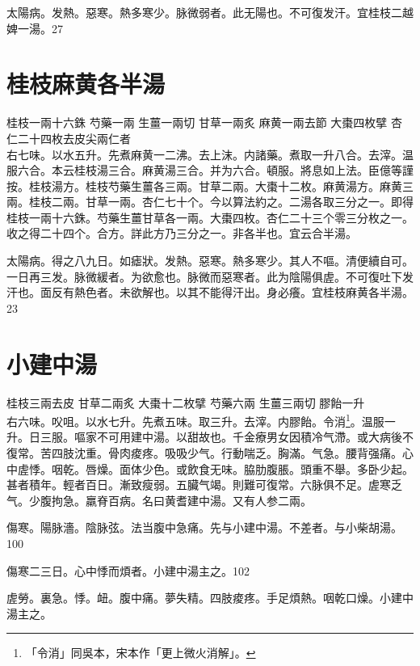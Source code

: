 太陽病。发熱。惡寒。熱多寒少。脉微弱者。此无陽也。不可{\khaai 復}发汗。{\khaai 宜桂枝二越婢一湯。}27

\section{桂枝麻黄各半湯}

桂枝{\scriptsize 一兩十六銖} 芍藥{\scriptsize 一兩} 生薑{\scriptsize 一兩切} 甘草{\scriptsize 一兩炙} 麻黄{\scriptsize 一兩去節} 大棗{\scriptsize 四枚擘} 杏仁{\scriptsize 二十四枚去皮尖兩仁者}\\
右七味。以水五升。先煮麻黄一二沸。去上沫。内諸藥。煮取一升八合。去滓。温服六合。本云桂枝湯三合。麻黄湯三合。并为六合。頓服。將息如上法。{\scriptsize 臣億等謹按。桂枝湯方。桂枝芍藥生薑各三兩。甘草二兩。大棗十二枚。麻黄湯方。麻黄三兩。桂枝二兩。甘草一兩。杏仁七十个。今以算法約之。二湯各取三分之一。即得桂枝一兩十六銖。芍藥生薑甘草各一兩。大棗四枚。杏仁二十三个零三分枚之一。收之得二十四个。合方。詳此方乃三分之一。非各半也。宜云合半湯。}

太陽病。得之八九日。如瘧狀。发熱。惡寒。熱多寒少。其人不嘔。清便續自可。一日再三发。脉微緩者。为欲愈也。脉微而惡寒者。此为陰陽俱虗。不可復{\khaai 吐下}发汗也。面反有熱色者。未欲解也。以其不能得汗出。身必癢。宜桂枝麻黄各半湯。23

\section{小建中湯}

桂枝{\scriptsize 三兩去皮} 甘草{\scriptsize 二兩炙} 大棗{\scriptsize 十二枚擘} 芍藥{\scriptsize 六兩} 生薑{\scriptsize 三兩切} 膠飴{\scriptsize 一升}\\
右六味。{\khaai 㕮咀。}以水七升。{\khaai 先}煮{\khaai 五味。}取三升。去滓。内{\khaai 膠}飴。令消\footnote{「令消」同吳本，宋本作「更上微火消解」。}。温服一升。日三服。{\scriptsize 嘔家不可用建中湯。以甜故也。千金療男女因積冷气滯。或大病後不復常。苦四肢沈重。骨肉痠疼。吸吸少气。行動喘乏。胸滿。气急。腰背强痛。心中虗悸。咽乾。唇燥。面体少色。或飲食无味。脇肋腹脹。頭重不舉。多卧少起。甚者積年。輕者百日。漸致瘦弱。五臟气竭。則難可復常。六脉俱不足。虗寒乏气。少腹拘急。羸脊百病。名曰黄耆建中湯。又有人参二兩。}

傷寒。陽脉濇。陰脉弦。法当腹中急痛。先与小建中湯。不差者。与小柴胡湯。100

傷寒二三日。心中悸而煩者。小建中湯主之。102

虗勞。裏急。悸。衄。腹中痛。夢失精。四肢痠疼。手足煩熱。咽乾口燥。小建中湯主之。

